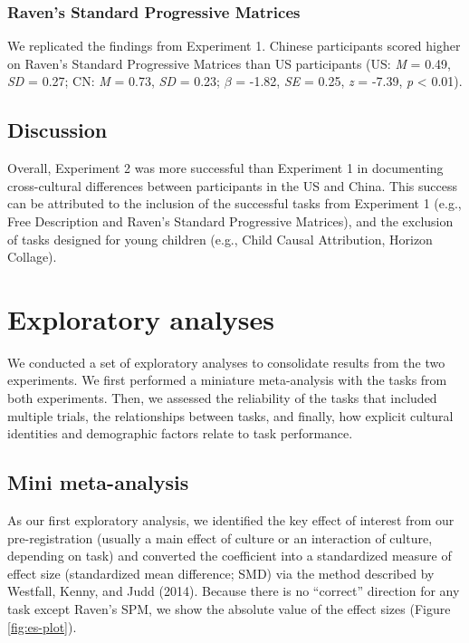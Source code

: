 \documentclass[
  man,floatsintext]{apa6}
\begin{document}
\hypertarget{ravens-standard-progressive-matrices-2}{%
\subsubsection{Raven's Standard Progressive Matrices}\label{ravens-standard-progressive-matrices-2}}

We replicated the findings from Experiment 1. Chinese participants scored higher on Raven's Standard Progressive Matrices than US participants (US: \emph{M} = 0.49, \emph{SD} = 0.27; CN: \emph{M} = 0.73, \emph{SD} = 0.23; \(\beta\) = -1.82, \emph{SE} = 0.25, \emph{z} = -7.39, \emph{p} \textless{} 0.01).

\hypertarget{discussion-1}{%
\subsection{Discussion}\label{discussion-1}}

Overall, Experiment 2 was more successful than Experiment 1 in documenting cross-cultural differences between participants in the US and China. This success can be attributed to the inclusion of the successful tasks from Experiment 1 (e.g., Free Description and Raven's Standard Progressive Matrices), and the exclusion of tasks designed for young children (e.g., Child Causal Attribution, Horizon Collage).

\hypertarget{exploratory-analyses}{%
\section{Exploratory analyses}\label{exploratory-analyses}}

We conducted a set of exploratory analyses to consolidate results from the two experiments. We first performed a miniature meta-analysis with the tasks from both experiments. Then, we assessed the reliability of the tasks that included multiple trials, the relationships between tasks, and finally, how explicit cultural identities and demographic factors relate to task performance.

\hypertarget{mini-meta-analysis}{%
\subsection{Mini meta-analysis}\label{mini-meta-analysis}}

As our first exploratory analysis, we identified the key effect of interest from our pre-registration (usually a main effect of culture or an interaction of culture, depending on task) and converted the coefficient into a standardized measure of effect size (standardized mean difference; SMD) via the method described by Westfall, Kenny, and Judd (2014). Because there is no ``correct'' direction for any task except Raven's SPM, we show the absolute value of the effect sizes (Figure \ref{fig:es-plot}).
\end{document}
